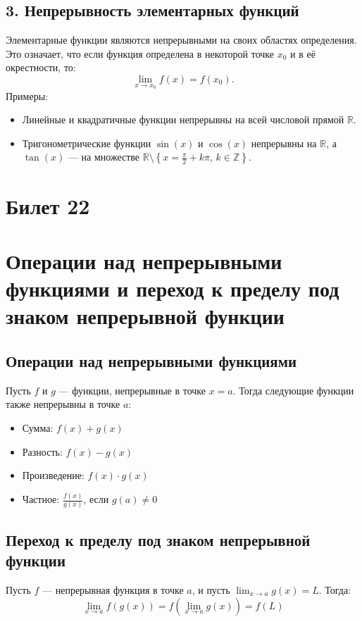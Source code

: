 \documentclass{article}
\begin{document}
\subsection*{3. Непрерывность элементарных функций}
Элементарные функции являются непрерывными на своих областях определения. Это означает, что если функция определена в некоторой точке $x_0$ и в её окрестности, то:
\[
\lim_{x \to x_0} f(x) = f(x_0).
\]
Примеры:
\begin{itemize}
    \item Линейные и квадратичные функции непрерывны на всей числовой прямой $\mathbb{R}$.
    \item Тригонометрические функции $\sin(x)$ и $\cos(x)$ непрерывны на $\mathbb{R}$, а $\tan(x)$ — на множестве $\mathbb{R} \setminus \left\{x = \frac{\pi}{2} + k\pi, \, k \in \mathbb{Z}\right\}$.
\end{itemize}



\section{Билет 22}


\section*{Операции над непрерывными функциями и переход к пределу под знаком непрерывной функции}

\subsection*{Операции над непрерывными функциями}
Пусть $f$ и $g$ — функции, непрерывные в точке $x = a$. Тогда следующие функции также непрерывны в точке $a$:
\begin{itemize}
    \item Сумма: $f(x) + g(x)$
    \item Разность: $f(x) - g(x)$
    \item Произведение: $f(x) \cdot g(x)$
    \item Частное: $\frac{f(x)}{g(x)}$, если $g(a) \neq 0$
\end{itemize}

\subsection*{Переход к пределу под знаком непрерывной функции}
Пусть $f$ — непрерывная функция в точке $a$, и пусть $\lim_{x \to a} g(x) = L$. Тогда:
\[
\lim_{x \to a} f(g(x)) = f\left(\lim_{x \to a} g(x)\right) = f(L)
\]
\end{document}
